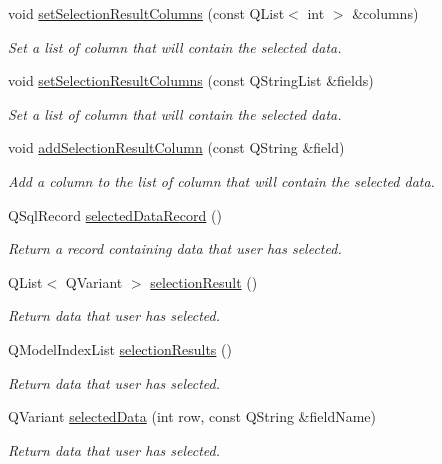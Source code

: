 \begin{DoxyCompactItemize}
void \hyperlink{classmdt_sql_selection_dialog_a88311778de191bf78e351ea4370b9a6d}{set\-Selection\-Result\-Columns} (const Q\-List$<$ int $>$ \&columns)
\begin{DoxyCompactList}\small\item\em Set a list of column that will contain the selected data. \end{DoxyCompactList}\item 
void \hyperlink{classmdt_sql_selection_dialog_a5c5c36414bf3c432979f53ad27f985cb}{set\-Selection\-Result\-Columns} (const Q\-String\-List \&fields)
\begin{DoxyCompactList}\small\item\em Set a list of column that will contain the selected data. \end{DoxyCompactList}\item 
void \hyperlink{classmdt_sql_selection_dialog_ae5582bd717078a137dd71d5a1b9cc9f9}{add\-Selection\-Result\-Column} (const Q\-String \&field)
\begin{DoxyCompactList}\small\item\em Add a column to the list of column that will contain the selected data. \end{DoxyCompactList}\item 
Q\-Sql\-Record \hyperlink{classmdt_sql_selection_dialog_affdf9a9936509c8b6ca141b8ff415995}{selected\-Data\-Record} ()
\begin{DoxyCompactList}\small\item\em Return a record containing data that user has selected. \end{DoxyCompactList}\item 
Q\-List$<$ Q\-Variant $>$ \hyperlink{classmdt_sql_selection_dialog_a23592c799f3b8945b3f5e72082dc265b}{selection\-Result} ()
\begin{DoxyCompactList}\small\item\em Return data that user has selected. \end{DoxyCompactList}\item 
Q\-Model\-Index\-List \hyperlink{classmdt_sql_selection_dialog_a85b7c1e3e156c141315d0873fa36d4b3}{selection\-Results} ()
\begin{DoxyCompactList}\small\item\em Return data that user has selected. \end{DoxyCompactList}\item 
Q\-Variant \hyperlink{classmdt_sql_selection_dialog_aab4943bc01e64f867791c15eea613e23}{selected\-Data} (int row, const Q\-String \&field\-Name)
\begin{DoxyCompactList}\small\item\em Return data that user has selected. \end{DoxyCompactList}\end{DoxyCompactItemize}


